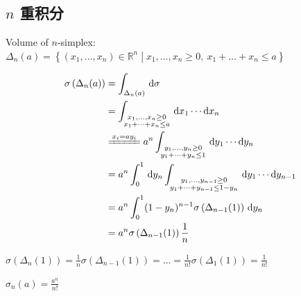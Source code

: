 \subsection{$n$ 重积分}

\begin{example}
    Volume of $n$-simplex: $\Delta_n(a)=\left\{(x_1,\dots,x_n)\in\mathbb{R}^n\middle|x_1,\dots, x_n\geq 0,\ x_1+\dots+x_n\leq a\right\}$

    \begin{align*}
        \sigma\left(\Delta_n(a)\right)
         & =\int_{\Delta_n(a)}\,\mathrm{d}\sigma                                      \\
         & =\int_{\substack{x_1,\dots, x_n\geq 0                                      \\
        x_1+\dots+x_n\leq a}}\,\mathrm{d}x_1\cdots\mathrm{d}x_n                       \\
         & \xlongequal{x_i=ay_i}a^n\int_{\substack{y_1,\dots, y_n\geq 0               \\
        y_1+\dots+y_n\leq 1}}\,\mathrm{d}y_1\cdots\mathrm{d}y_n                       \\
         & =a^n\int_0^1\,\mathrm{d}y_n\int_{\substack{y_1,\dots, y_{n-1}\geq 0        \\
        y_1+\dots+y_{n-1}\leq 1-y_n}}\,\mathrm{d}y_1\cdots\mathrm{d}y_{n-1}           \\
         & =a^n\int_0^1(1-y_n)^{n-1}\sigma\left(\Delta_{n-1}(1)\right)\,\mathrm{d}y_n \\
         & =a^n\sigma\left(\Delta_{n-1}(1)\right)\frac{1}{n}
    \end{align*}

    $\sigma(\Delta_n(1))=\frac{1}{n}\sigma(\Delta_{n-1}(1))=\dots=\frac{1}{n!}\sigma(\Delta_1(1))=\frac{1}{n!}$

    $\boxed{\sigma_n(a)=\frac{a^n}{n!}}$
\end{example}

